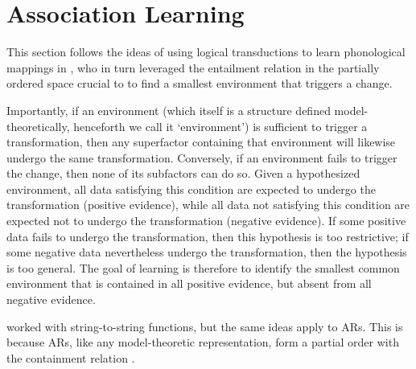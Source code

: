 
\section{Association Learning}
This section follows the ideas of using logical transductions to learn
phonological mappings in \citet{yolyan2025logical}, who in turn
leveraged the entailment relation in the partially ordered space crucial
to \citet{chandleeBufia2019} to find a smallest environment that
triggers a change.

Importantly, if an environment (which itself is a structure defined
model-theoretically, henceforth we call it `environment') is sufficient
to trigger a transformation, then any superfactor containing that
environment will likewise undergo the same transformation. Conversely,
if an environment fails to trigger the change, then none of its
subfactors can do so. Given a hypothesized environment, all data
satisfying this condition are expected to undergo the transformation
(positive evidence), while all data not satisfying this condition are
expected not to undergo the transformation (negative evidence). If some
positive data fails to undergo the transformation, then this hypothesis
is too restrictive; if some negative data nevertheless undergo the
transformation, then the hypothesis is too general. The goal of learning
is therefore to identify the smallest common environment that is
contained in all positive evidence, but absent from all negative
evidence.

\citet{yolyan2025logical} worked with string-to-string functions, but
the same ideas apply to ARs. This is because ARs, like any
model-theoretic representation, form a partial order with the
containment relation \citep{chandleeBufia2019}.




